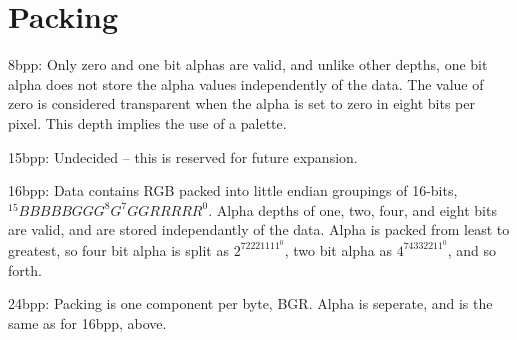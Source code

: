 %
% 
% 
\def\FileCreated{Fri Jun 22 17:09:00 2001}
\def\FileRevised{Fri Jun 22 18:25:00 2001}

\section{Packing}

8bpp: Only zero and one bit alphas are valid, and unlike other depths,
one bit alpha does not store the alpha values independently of the data.
The value of zero is considered transparent when the alpha is set to
zero in eight bits per pixel. This depth implies the use of a palette.

15bpp: Undecided -- this is reserved for future expansion.

16bpp: Data contains RGB packed into little endian groupings of 16-bits,
$^{15}BBBBBGGG^8 G^7GGRRRRR^0$. Alpha depths of one, two, four, and
eight bits are valid, and are stored independantly of the data. Alpha is
packed from least to greatest, so four bit alpha is split as $2^72221111^0$,
two bit alpha as $4^74332211^0$, and so forth.

24bpp: Packing is one component per byte, BGR. Alpha is seperate, and
is the same as for 16bpp, above.
